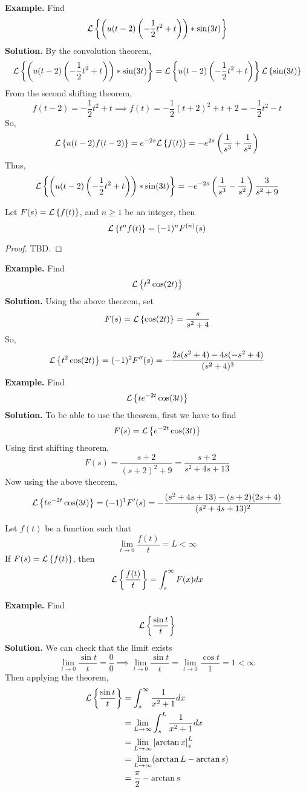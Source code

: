 \documentclass[openany]{report}
\begin{document}
\noindent


\textbf{Example.} Find 
\[\mathcal{L}\left\{\left(u(t-2)\left(-\frac{1}{2}t^2 + t\right)\right)*\sin(3t)\right\}\]
\textbf{Solution.} By the convolution theorem, 
\[\mathcal{L}\left\{\left(u(t-2)\left(-\frac{1}{2}t^2 + t\right)\right)*\sin(3t)\right\} = \mathcal{L}\left\{u(t-2)\left(-\frac{1}{2}t^2 + t\right)\right\}\mathcal{L}\left\{\sin(3t)\right\}\]
From the second shifting theorem, 
\[f(t-2) = -\frac{1}{2}t^2 + t \implies f(t) = -\frac{1}{2}(t+2)^2 + t + 2 = -\frac{1}{2}t^2 - t\]
So, 
\[\mathcal{L}\left\{u(t-2)f(t-2)\right\} = e^{-2s}\mathcal{L}\left\{f(t)\right\} = -e^{2s}\left(\frac{1}{s^3} + \frac{1}{s^2}\right)\]
Thus, 
\[\mathcal{L}\left\{\left(u(t-2)\left(-\frac{1}{2}t^2 + t\right)\right)*\sin(3t)\right\} = -e^{-2s}\left(\frac{1}{s^3} - \frac{1}{s^2}\right)\frac{3}{s^2 + 9} \]
\begin{theorem}
    Let $F(s) = \mathcal{L}\left\{f(t)\right\}$, and $n \geq 1$ be an integer, then 
    \[\mathcal{L}\left\{t^nf(t)\right\} = (-1)^nF^{(n)}(s)\]
\end{theorem}
\begin{proof}
    TBD.
\end{proof}
\noindent
\textbf{Example.} Find 
\[\mathcal{L}\left\{t^2\cos(2t)\right\}\]
\textbf{Solution.}
Using the above theorem, set 
\[F(s) = \mathcal{L}\left\{\cos(2t)\right\} = \frac{s}{s^2 + 4}\]
So, 
\[\mathcal{L}\left\{t^2\cos(2t)\right\} = (-1)^2F''(s) = -\frac{2s(s^2+4)-4s(-s^2+4)}{(s^2+4)^3}\]
\noindent
\textbf{Example.} Find 
\[\mathcal{L}\left\{te^{-2t}\cos(3t)\right\}\]
\textbf{Solution.} To be able to use the theorem, first we have to find 
\[F(s) = \mathcal{L}\left\{e^{-2t}\cos(3t)\right\}\]
Using first shifting theorem, 
\[F(s) = \frac{s+2}{(s+2)^2 + 9} =  \frac{s + 2}{s^2 + 4s + 13}\]
Now using the above theorem, 
\[\mathcal{L}\left\{te^{-2t}\cos(3t)\right\} = (-1)^1F'(s) = -\frac{(s^2+4s+13)-(s+2)(2s+4)}{(s^2+4s+13)^2}\]

\begin{theorem}
    Let $f(t)$ be a function such that 
    \[\lim_{t\rightarrow 0} \frac{f(t)}{t} = L < \infty\]
    If $F(s) = \mathcal{L}\left\{f(t)\right\}$, then
    \[\mathcal{L}\left\{\frac{f(t)}{t}\right\} = \int_s^\infty F(x)dx\]
\end{theorem}
\noindent
\textbf{Example.} Find 
\[\mathcal{L}\left\{\frac{\sin t}{t}\right\}\]
\textbf{Solution.} We can check that the limit exists 
\[\lim_{t\rightarrow 0}\frac{\sin t}{t} = \frac{0}{0} \implies \lim_{t\rightarrow 0} \frac{\sin t}{t} = \lim_{t\rightarrow 0}\frac{\cos t}{1} = 1 < \infty\]
Then applying the theorem, 
\begin{align*}
    \mathcal{L}\left\{\frac{\sin t}{t}\right\} &= \int_s^\infty \frac{1}{x^2 + 1}dx\\
    &= \lim_{L \rightarrow \infty} \int_s^L \frac{1}{x^2+1}dx\\
    &= \lim_{L\rightarrow \infty} \left[\arctan x\right]_s^L \\
    &= \lim_{L \rightarrow \infty} (\arctan L - \arctan s )\\
    &= \frac{\pi}{2} - \arctan s
\end{align*}
\noindent
\end{document}
